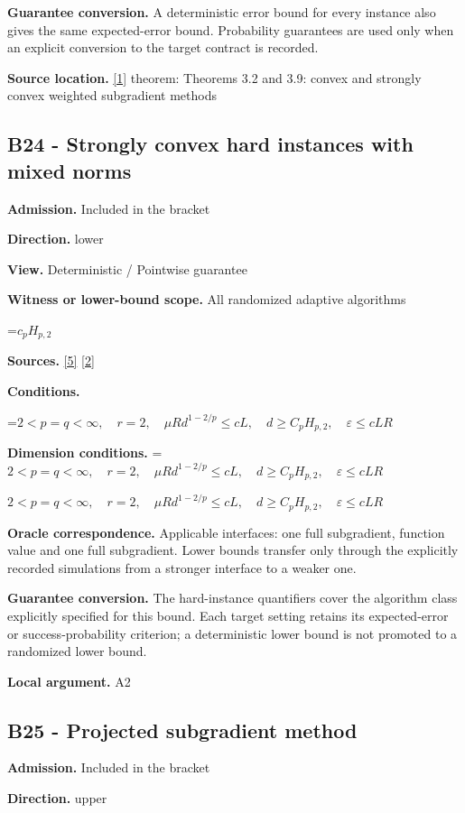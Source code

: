 \documentclass[10pt,a4paper]{article}
\newcommand{\AtlasMath}[1]{\par\begingroup\centering\setbox0=\hbox{$\displaystyle #1$}\ifdim\wd0>1.4\linewidth\typeout{ATLAS WIDE FORMULA: \the\wd0}\fi\ifdim\wd0>\linewidth\resizebox{\linewidth}{!}{\box0}\else\box0\fi\par\endgroup}
\newcommand{\AtlasInlineMath}[1]{\begingroup\setbox0=\hbox{$#1$}\ifdim\wd0>.4\linewidth\endgroup\AtlasMath{#1}\else\endgroup$#1$\fi}
\begin{document}
\textbf{Guarantee conversion.} A deterministic error bound for every instance also gives the same expected-error bound. Probability guarantees are used only when an explicit conversion to the target contract is recorded.

\textbf{Source location.} \href{https://arxiv.org/pdf/1405.4980}{[1]} theorem: Theorems 3.2 and 3.9: convex and strongly convex weighted subgradient methods

\subsection{B24 - Strongly convex hard instances with mixed norms}
\textbf{Admission.} Included in the bracket

\textbf{Direction.} lower

\textbf{View.} Deterministic / Pointwise guarantee

\textbf{Witness or lower-bound scope.} All randomized adaptive algorithms

\AtlasMath{c_pH_{p,2}}
\textbf{Sources.} \href{https://arxiv.org/pdf/1407.5144}{[5]} \href{https://arxiv.org/pdf/1401.1792}{[2]}

\textbf{Conditions.} 
\AtlasMath{2<p=q<\infty,\quad r=2,\quad\mu R d^{1-2/p}\le cL,\quad d\ge C_pH_{p,2},\quad\varepsilon\le cLR}


\textbf{Dimension conditions.} \AtlasInlineMath{2<p=q<\infty,\quad r=2,\quad\mu R d^{1-2/p}\le cL,\quad d\ge C_pH_{p,2},\quad\varepsilon\le cLR}

\textbf{Oracle correspondence.} Applicable interfaces: one full subgradient, function value and one full subgradient. Lower bounds transfer only through the explicitly recorded simulations from a stronger interface to a weaker one.

\textbf{Guarantee conversion.} The hard-instance quantifiers cover the algorithm class explicitly specified for this bound. Each target setting retains its expected-error or success-probability criterion; a deterministic lower bound is not promoted to a randomized lower bound.

\textbf{Local argument.} A2

\subsection{B25 - Projected subgradient method}
\textbf{Admission.} Included in the bracket

\textbf{Direction.} upper
\end{document}
